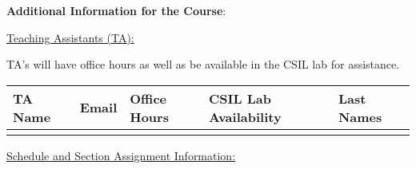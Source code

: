 \noindent \textbf {\Large \sc Additional Information for the Course}:

\vspace{1cm}

\noindent \underline{Teaching Assistants (TA):}

\noindent TA's will have office hours as well as be available in the CSIL lab for assistance.

\vspace{1cm}

\begin{tabular}{l l | l | l l }

TA Name & Email & Office Hours & CSIL Lab Availability & Last Names \\ \hline

 &  &  &  & \\


\end{tabular}

\vspace{1cm}

%  
%  
%
%  
%
\noindent \underline{Schedule and Section Assignment Information:}

